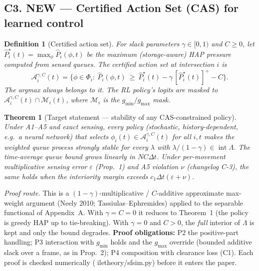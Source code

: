 \documentclass[11pt,a4paper]{article}
\newtheorem{theorem}{Theorem}
\newtheorem{definition}{Definition}
\begin{document}
\subsection*{C3. NEW --- Certified Action Set (CAS) for learned control}
\begin{definition}[Certified action set]
For slack parameters $\gamma\in[0,1)$ and $C\ge0$, let
$\hat P^\star_i(t)=\max_{\phi}\hat P_i(\phi,t)$ be the maximum (storage-aware) HAP pressure
computed from \emph{sensed} queues. The certified action set at intersection $i$ is
\[
\mathcal A^{\gamma,C}_i(t) = \Big\{\phi\in\Phi_i:\ \hat P_i(\phi,t)\ \ge\ \hat P^\star_i(t)
 - \gamma\,[\hat P^\star_i(t)]^+ - C\Big\}.
\]
The argmax always belongs to it. The RL policy's logits are masked to
$\mathcal A_i^{\gamma,C}(t)\cap\mathcal M_i(t)$, where $\mathcal M_i$ is the
$g_{\min}/g_{\max}$ mask.
\end{definition}

\begin{theorem}[Target statement --- stability of any CAS-constrained policy]
Under A1--A5 and exact sensing, every policy (stochastic, history-dependent, e.g.\ a neural
network) that selects $\phi_i(t)\in\mathcal A_i^{\gamma,C}(t)$ for all $i,t$ makes the
weighted queue process strongly stable for every $\lambda$ with
$\lambda/(1-\gamma)\in\operatorname{int}\Lambda$. The time-average queue bound grows
linearly in $NC\Delta t$. Under per-movement multiplicative sensing error $\varepsilon$
(Prop.~1) and A5 violation $\nu$ (changelog C-3), the same holds when the interiority
margin exceeds $c_1\Delta t(\varepsilon+\nu)$.
\end{theorem}
\noindent\emph{Proof route.} This is a $(1-\gamma)$-multiplicative / $C$-additive
approximate max-weight argument (Neely 2010; Tassiulas--Ephremides) applied to the
separable functional of Appendix~A. With $\gamma=C=0$ it reduces to Theorem~1 (the
policy is greedy HAP up to tie-breaking). With $\gamma=0$ and $C>0$, the \emph{full}
interior of $\Lambda$ is kept and only the bound degrades.
\textbf{Proof obligations:} P2 the positive-part handling; P3 interaction with $g_{\min}$
holds and the $g_{\max}$ override (bounded additive slack over a frame, as in Prop.~2);
P4 composition with clearance loss (C1). Each proof is checked numerically
(ile{theory/sfsim.py}) before it enters the paper.
\end{document}
